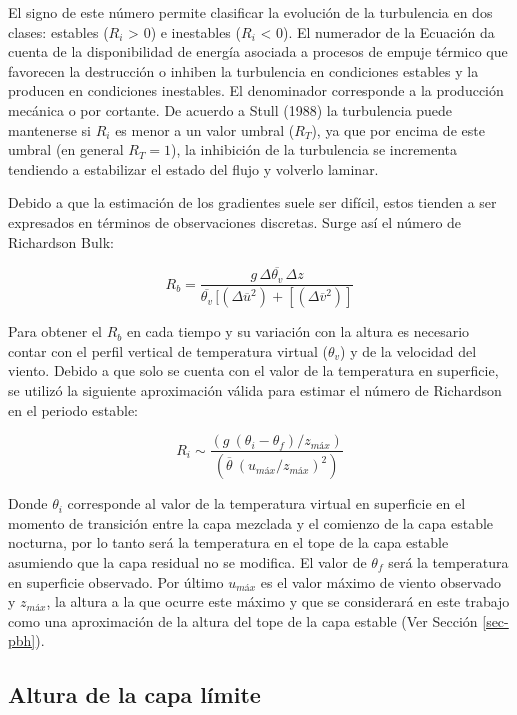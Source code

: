 \documentclass[12pt,spanish,oneside, a4paper]{book}
\begin{document}
El signo de este número permite clasificar la evolución de la
turbulencia en dos clases: estables (\(R_i\) \textgreater{} 0) e
inestables (\(R_i\) \textless{} 0). El numerador de la Ecuación da
cuenta de la disponibilidad de energía asociada a procesos de empuje
térmico que favorecen la destrucción o inhiben la turbulencia en
condiciones estables y la producen en condiciones inestables. El
denominador corresponde a la producción mecánica o por cortante. De
acuerdo a Stull (1988) la turbulencia puede mantenerse si \(R_i\) es
menor a un valor umbral (\(R_T\)), ya que por encima de este umbral (en
general \(R_T = 1\)), la inhibición de la turbulencia se incrementa
tendiendo a estabilizar el estado del flujo y volverlo laminar.

Debido a que la estimación de los gradientes suele ser difícil, estos
tienden a ser expresados en términos de observaciones discretas. Surge
así el número de Richardson Bulk:

\begin{equation} \label{eq-ri2}
R_b = \frac{g \, \Delta \overline{\theta_v} \, \Delta z}{\overline{\theta_v} \, [(\Delta \overline{u}^2) + [(\Delta \overline{v}^2)]}
\end{equation}

Para obtener el \(R_b\) en cada tiempo y su variación con la altura es
necesario contar con el perfil vertical de temperatura virtual
(\(\theta_v\)) y de la velocidad del viento. Debido a que solo se cuenta
con el valor de la temperatura en superficie, se utilizó la siguiente
aproximación válida para estimar el número de Richardson en el periodo
estable:

\begin{equation} \label{eq-ri3}
R_i \sim \frac{(g  \: (\theta_i - \theta_f)/z_{máx})}{(\overline{\theta} \: (u_{máx}/z_{máx})^2)}
\end{equation}

Donde \(\theta_i\) corresponde al valor de la temperatura virtual en
superficie en el momento de transición entre la capa mezclada y el
comienzo de la capa estable nocturna, por lo tanto será la temperatura
en el tope de la capa estable asumiendo que la capa residual no se
modifica. El valor de \(\theta_f\) será la temperatura en superficie
observado. Por último \(u_{máx}\) es el valor máximo de viento observado
y \(z_{máx}\), la altura a la que ocurre este máximo y que se
considerará en este trabajo como una aproximación de la altura del tope
de la capa estable (Ver Sección \ref{sec-pbh}).

\subsection{\texorpdfstring{Altura de la capa límite
\label{sec-pbh}}{Altura de la capa límite }}\label{altura-de-la-capa-limite}
\end{document}
